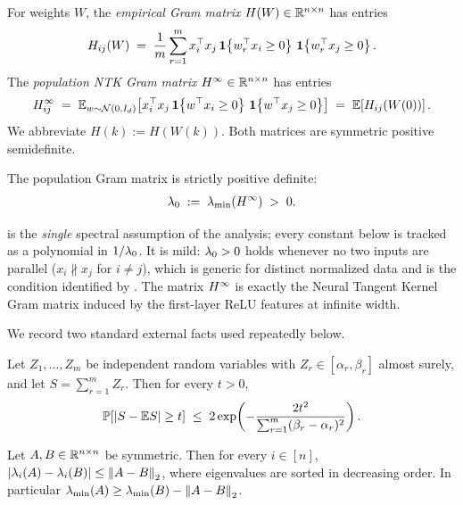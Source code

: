 \begin{definition}\label{def:gram}
For weights $W$, the \emph{empirical Gram matrix} $H(W) \in \mathbb{R}^{n \times n}$ has entries
\begin{align}\label{eq:emp-gram}
H_{ij}(W)
\;=\;
\frac{1}{m} \sum_{r=1}^{m} x_i^{\top} x_j \,
\mathbf{1}\!\left\{w_r^{\top} x_i \ge 0\right\}\,\mathbf{1}\!\left\{w_r^{\top} x_j \ge 0\right\}.
\end{align}
The \emph{population NTK Gram matrix} $H^{\infty} \in \mathbb{R}^{n \times n}$ has entries
\begin{align}\label{eq:pop-gram}
H^{\infty}_{ij}
\;=\;
\mathbb{E}_{w \sim \mathcal{N}(0, I_d)}\!\left[ x_i^{\top} x_j \,
\mathbf{1}\!\left\{w^{\top} x_i \ge 0\right\}\,\mathbf{1}\!\left\{w^{\top} x_j \ge 0\right\} \right]
\;=\;
\mathbb{E}\!\left[ H_{ij}(W(0)) \right].
\end{align}
We abbreviate $H(k) := H(W(k))$. Both matrices are symmetric positive semidefinite.
\end{definition}

\begin{assumption}\label{ass:lambda0}
The population Gram matrix is strictly positive definite:
\begin{align*}
\lambda_{0} \;:=\; \lambda_{\min}\!\left( H^{\infty} \right) \;>\; 0 .
\end{align*}
\end{assumption}

\begin{remark}\label{rem:lambda0-mild}
 is the \emph{single} spectral assumption of the analysis; every constant
below is tracked as a polynomial in $1/\lambda_{0}$. It is mild: $\lambda_{0} > 0$ holds whenever no two
inputs are parallel ($x_i \not\parallel x_j$ for $i \ne j$), which is generic for distinct
normalized data and is the condition identified by \cite{du2019gradient}. The matrix $H^{\infty}$
is exactly the Neural Tangent Kernel Gram matrix induced by the first-layer ReLU features at
infinite width.
\end{remark}

We record two standard external facts used repeatedly below.

\begin{fact}\label{fac:hoeffding}
Let $Z_1, \dots, Z_m$ be independent random variables with $Z_r \in [\alpha_r, \beta_r]$
almost surely, and let $S = \sum_{r=1}^m Z_r$. Then for every $t > 0$,
\begin{align*}
\mathbb{P}\!\left[ \left| S - \mathbb{E} S \right| \ge t \right]
\;\le\;
2 \exp\!\left( - \frac{2 t^2}{\sum_{r=1}^m (\beta_r - \alpha_r)^2} \right).
\end{align*}
\end{fact}

\begin{fact}\label{fac:weyl}
Let $A, B \in \mathbb{R}^{n \times n}$ be symmetric. Then for every $i \in [n]$,
$\left| \lambda_i(A) - \lambda_i(B) \right| \le \left\| A - B \right\|_{2}$, where eigenvalues are sorted in
decreasing order. In particular $\lambda_{\min}(A) \ge \lambda_{\min}(B) - \left\| A - B \right\|_{2}$.
\end{fact}
